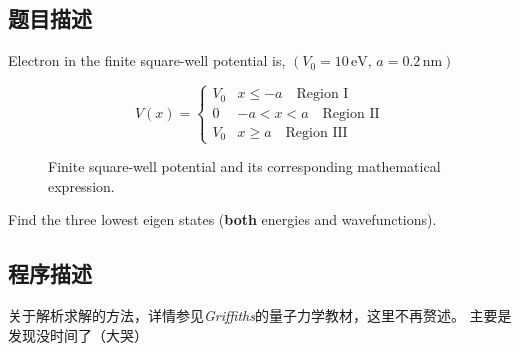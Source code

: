 \subsection{题目描述}
Electron in the finite square-well potential is, \( (V_0 = 10 \, \text{eV}, \, a = 0.2 \, \text{nm}) \)

\begin{figure}[h!]
    \centering
    \begin{minipage}{0.45\textwidth}
        \[
            V(x) =
            \begin{cases}
                V_0 & x \leq -a \quad \text{Region I}   \\
                0   & -a < x < a \quad \text{Region II} \\
                V_0 & x \geq a \quad \text{Region III}
            \end{cases}
        \]
    \end{minipage}
    \hspace{0.05\textwidth} %
    \begin{minipage}{0.4\textwidth}
        \centering
    \end{minipage}
    \caption{Finite square-well potential and its corresponding mathematical expression.}
\end{figure}


Find the three lowest eigen states (\textbf{both} energies and wavefunctions).
\subsection{程序描述}
关于解析求解的方法，详情参见\textit{Griffiths}的量子力学教材，这里不再赘述。
主要是发现没时间了（大哭）

